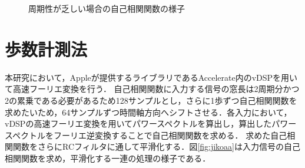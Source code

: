 \begin{figure}[tbhp]
  \caption{周期性が乏しい場合の自己相関関数の様子}
  \label{fig:jiko06}
\end{figure}

\section{歩数計測法}
本研究において，Appleが提供するライブラリであるAccelerate内のvDSPを用いて高速フーリエ変換を行う．
自己相関関数に入力する信号の窓長は2周期分かつ2の累乗である必要があるため128サンプルとし，さらに1歩ずつ自己相関関数を求めたいため，64サンプルずつ時間軸方向へシフトさせる．各入力において，vDSPの高速フーリエ変換を用いてパワースペクトルを算出し，算出したパワースペクトルをフーリエ逆変換することで自己相関関数を求める．
求めた自己相関関数をさらにRCフィルタに通して平滑化する．図\ref{fig:jikoaa}は入力信号の自己相関関数を求め，平滑化する一連の処理の様子である．

